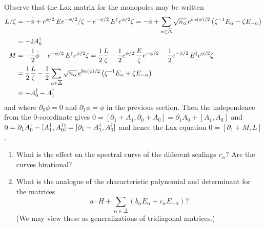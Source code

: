 \documentclass{article}
\begin{document}
Observe that the Lax matrix for the monopoles may be written 
\begin{align*}
L/\zeta&= -\dot\phi +e^{\phi/2}\,Ee^{-\phi/2}/\zeta-e^{-\phi/2}\,E\sp\dagger e^{\phi/2}\zeta
= -\dot\phi +
\sum_{\alpha\in\bar\Delta}\sqrt{n_\alpha}\, e^{b\alpha(\phi)/2} \left(
\zeta\sp{-1} E_\alpha - \zeta E_{-\alpha}
\right)\\
&=-2 A_0\sp\dagger\\
M&=-\frac12 \dot\phi -e^{-\phi/2}\,E\sp\dagger e^{\phi/2}\zeta
=\frac12 \frac{L}{\zeta} -\frac12 e^{\phi/2}\,\frac{E}{\zeta}e^{-\phi/2}-\frac12 e^{-\phi/2}\,E\sp\dagger e^{\phi/2}\zeta\\
&=\frac12 \frac{L}{\zeta} -\frac12 \sum_{\alpha\in\bar\Delta}\sqrt{n_\alpha}\, e^{b\alpha(\phi)/2} \left(
\zeta\sp{-1} E_\alpha + \zeta E_{-\alpha}
\right)\\
&=-A_0\sp\dagger - A_1\sp\dagger
\end{align*}
and where $\partial_0\phi=0$ and $\partial_1\phi=\dot\phi$ in the previous section. Then the independence
from the $0$-coordinate gives
$0=[\partial_1+A_1, \partial_0+A_0]= \partial_1 A_0 +[A_1, A_0]$ and
$0=\partial_1 A_0\sp\dagger -[A_1\sp\dagger, A_0\sp\dagger] = [\partial_1 -A_1\sp\dagger, A_0\sp\dagger] $
and hence the Lax equation $0=[\partial_1 +M,L]$.

\begin{enumerate}
	\item What is the effect on the spectral curve of the different scalings $r_\alpha$? Are the curves birational?
	\item What is the analogue of the characteristic polynomial and determinant for the matrices
	$$a\cdot H+\sum_{\alpha\in\bar\Delta} \left(b_\alpha E_\alpha+c_{\alpha}E_{-\alpha}\right)?$$
	(We may view these as generalizations of tridiagonal matrices.)
\end{enumerate}


%

\end{document}
